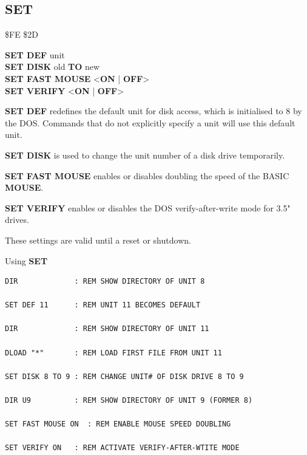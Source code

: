 
\newpage
\subsection{SET}
\begin{description}[leftmargin=2cm,style=nextline]
\item [Token:]    \$FE \$2D

\item [Format:]   {\bf SET DEF} unit \\
                  {\bf SET DISK} old {\bf TO} new \\
                  {\bf SET FAST MOUSE} <{\bf ON} | {\bf OFF}> \\
                  {\bf SET VERIFY} <{\bf ON} | {\bf OFF}>

\item [Usage:]    {\bf SET DEF} redefines the default unit for disk access, which is initialised to 8 by the DOS. Commands that do not explicitly specify a unit will use this default unit.

                  {\bf SET DISK} is used to change the unit number of a disk drive temporarily.

                  {\bf SET FAST MOUSE} enables or disables doubling the speed of the BASIC {\bf MOUSE}.

                  {\bf SET VERIFY} enables or disables the DOS verify-after-write mode for 3.5" drives.

\item [Remarks:]  These settings are valid until a reset or shutdown.

\item [Examples:] Using {\bf SET}

\begin{tcolorbox}[colback=black,coltext=white]
\verbatimfont{\codefont}
\begin{verbatim}
DIR             : REM SHOW DIRECTORY OF UNIT 8

SET DEF 11      : REM UNIT 11 BECOMES DEFAULT

DIR             : REM SHOW DIRECTORY OF UNIT 11

DLOAD "*"       : REM LOAD FIRST FILE FROM UNIT 11

SET DISK 8 TO 9 : REM CHANGE UNIT# OF DISK DRIVE 8 TO 9

DIR U9          : REM SHOW DIRECTORY OF UNIT 9 (FORMER 8)

SET FAST MOUSE ON  : REM ENABLE MOUSE SPEED DOUBLING

SET VERIFY ON   : REM ACTIVATE VERIFY-AFTER-WTITE MODE
\end{verbatim}
\end{tcolorbox}
\end{description}

